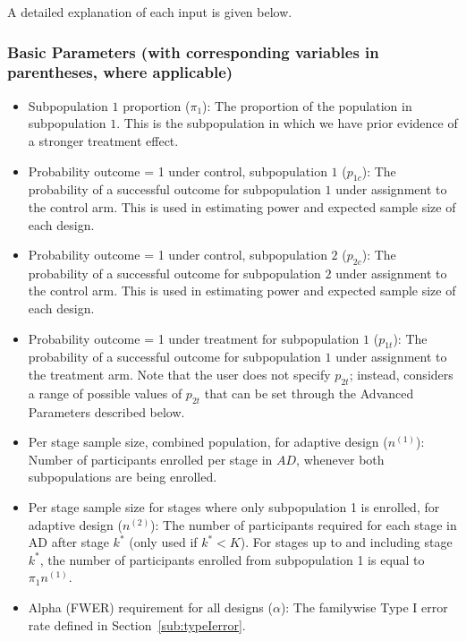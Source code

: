 \documentclass[article]{jss}
\begin{document}
A detailed explanation of each input is given below.

\subsubsection{Basic Parameters (with corresponding variables in parentheses, where applicable)} 
\label{sub:basic-params}
\begin{itemize} 

\item Subpopulation $1$ proportion ($π_1$): The proportion of the population in subpopulation $1$. This is the subpopulation in which we have prior evidence of a stronger treatment effect. 

\item Probability outcome = 1 under control, subpopulation $1$ ($p_{1c}$): The probability of a successful outcome for subpopulation $1$ under assignment to the control arm. This is used in estimating power and expected sample size of each design.

\item Probability outcome = 1 under control, subpopulation $2$ ($p_{2c}$): The probability of a successful outcome  for subpopulation $2$ under assignment to the control arm. This is used in estimating power and expected sample size of each design.

\item Probability outcome = 1 under treatment for subpopulation $1$ ($p_{1t}$): The probability of a successful outcome for  subpopulation $1$ under assignment to the treatment arm. Note that the user does not specify $p_{2t}$; instead,  considers a range of possible values of $p_{2t}$ that can be set through the Advanced Parameters described below.

\item Per stage sample size, combined population, for adaptive design ($n^{(1)}$): Number of participants enrolled per stage in $AD$, whenever both subpopulations are being enrolled.

\item Per stage sample size for stages where only subpopulation 1 is enrolled, for adaptive design ($n^{(2)}$): The number of participants required for each stage in AD after stage $k^*$ (only used if $k^* < K$). For stages up to and including stage $k^*$, the number of participants enrolled from subpopulation 1 is equal to $\pi_1 n^{(1)}$.


\item Alpha (FWER) requirement for all designs ($α$): The familywise Type I error rate defined in Section~\ref{sub:typeIerror}. 


\end{itemize}
\end{document}
